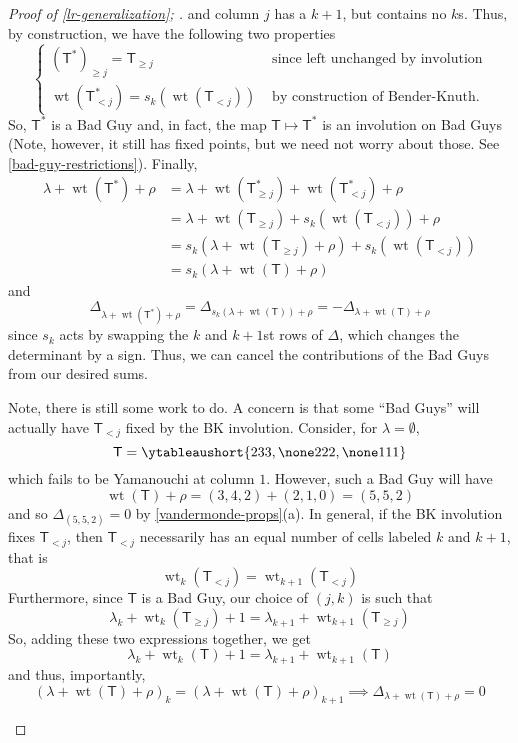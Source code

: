 \documentclass[11pt,leqno,oneside]{amsart}
\numberwithin{thm}{section}
\newcommand{\T}{\mathsf{T}} %
\newcommand{\Vdet}{\Delta}
\newcommand{\rowshift}{\rho}
\newcommand{\wt}{\operatorname{wt}}
\begin{document}
\begin{proof}[Proof of \ref{lr-generalization}; \cite{stembridge}]
  and column \(j\) has a \(k+1\), but contains no \(k\)s. Thus, by
  construction, we have the following two properties \[
    \begin{cases}
      (\T^*)_{\geq j} = \T_{\geq j} & \text{ since left unchanged by
        involution}\\
      \wt(\T^*_{< j}) = s_k(\wt(\T_{< j})) & \text{ by construction of
      Bender-Knuth.}
    \end{cases}
  \]
  So, \(\T^*\) is a Bad Guy and, in fact, the map \(\T \mapsto \T^*\)
  is an involution on Bad Guys (Note, however, it still has fixed
  points, but we need not worry about those. See
  \ref{bad-guy-restrictions}). Finally, 
  \begin{align*}
    \lambda+\wt(\T^*) + \rowshift
    & = \lambda + \wt(\T^*_{\geq j}) + \wt(\T^*_{<j}) + \rowshift\\
    & = \lambda + \wt(\T_{\geq j}) + s_k(\wt(\T_{<j})) + \rowshift\\
    & = s_k(\lambda+\wt(\T_{\geq j})+\rowshift) + s_k(\wt(\T_{<j}))\\
    & = s_k(\lambda+\wt(\T)+\rowshift)
  \end{align*}
  and \[
    \Vdet_{\lambda+\wt(\T^*)+\rowshift} =
    \Vdet_{s_k(\lambda+\wt(\T))+\rowshift} = 
    -\Vdet_{\lambda+\wt(\T)+\rowshift} 
  \]
  since \(s_k\) acts by swapping the \(k\) and \(k+1\)st rows of
  \(\Vdet\), which changes the determinant by a sign. Thus, we can
  cancel the contributions of the Bad Guys from our desired sums.
  \begin{rmk}\label{bad-guy-restrictions}
    Note, there is still some work to do. A concern is that some
    ``Bad Guys'' will actually have \(\T_{<j}\) fixed by the BK
    involution. Consider, for \(\lambda = \emptyset\), \[
      \T = \ytableaushort{233,\none222,\none111}
    \]
    which fails to be Yamanouchi at column \(1\). However, such a Bad
    Guy will have \[
      \wt(\T)+\rowshift = (3,4,2)+(2,1,0) = (5,5,2)
    \]
    and so \(\Vdet_{(5,5,2)} = 0\) by
    \ref{vandermonde-props}(a). In general, if the BK involution fixes
    \(\T_{<j}\), then \(\T_{<j}\) necessarily has an
    equal number of cells labeled \(k\) and \(k+1\), that is\[
      \wt_k(\T_{<j}) = \wt_{k+1}(\T_{<j})
    \]
    Furthermore, since
    \(\T\) is a Bad Guy, our choice of \((j,k)\) is such that \[
      \lambda_k+\wt_k(\T_{\geq j}) + 1 = \lambda_{k+1} + \wt_{k+1}(\T_{\geq j})
    \]
    So, adding these two expressions together, we get \[
      \lambda_k+\wt_k(\T)+1 = \lambda_{k+1}+\wt_{k+1}(\T)
    \]
    and thus, importantly, \[
      (\lambda+\wt(\T)+\rowshift)_k =
      (\lambda+\wt(\T)+\rowshift)_{k+1} \implies
      \Vdet_{\lambda+\wt(\T)+\rowshift} = 0
    \]
  \end{rmk}
\end{proof}
\end{document}

